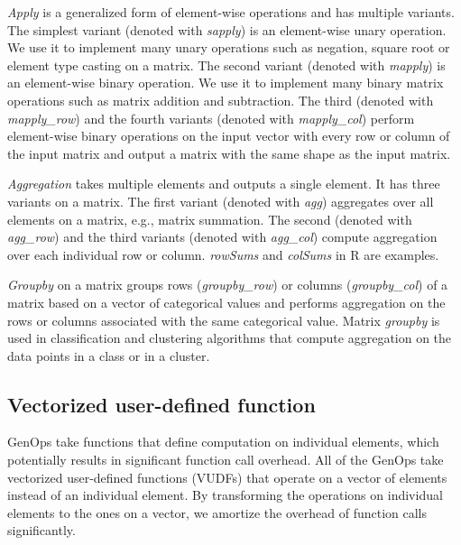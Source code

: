 \textit{Apply} is a generalized form of element-wise operations and has
multiple variants. The simplest variant (denoted with \textit{sapply}) is
an element-wise unary operation. We use it to implement many unary
operations such as negation, square root or element type casting
on a matrix. The second variant (denoted with \textit{mapply}) is an
element-wise binary operation. We use it to implement many binary
matrix operations such as matrix addition and subtraction. The third
(denoted with \textit{mapply\_row}) and the fourth variants (denoted with
\textit{mapply\_col}) perform element-wise
binary operations on the input vector with every row or column of the input
matrix and output a matrix with the same shape as the input matrix.

\textit{Aggregation} takes multiple elements and outputs a single element.
It has three variants on a matrix. The first variant (denoted with \textit{agg})
aggregates over all elements on a matrix, e.g., matrix summation. The second
(denoted with
\textit{agg\_row}) and the third variants (denoted with \textit{agg\_col})
compute aggregation over each individual row or column. \textit{rowSums}
and \textit{colSums} in R are examples.

\textit{Groupby} on a matrix groups rows (\textit{groupby\_row}) or columns
(\textit{groupby\_col}) of a matrix based on a vector of categorical values
and performs aggregation on the rows or
columns associated with the same categorical value. Matrix \textit{groupby}
is used in classification and clustering algorithms that compute
aggregation on the data points in a class or in a cluster.

\subsection{Vectorized user-defined function} \label{sec:vudf}
GenOps take functions that define computation on individual elements,
which potentially results in significant function call overhead. All of
the GenOps take vectorized user-defined functions (VUDFs) that operate on
a vector of elements instead of an individual element. By transforming
the operations on individual elements to the ones on a vector, we amortize
the overhead of function calls significantly.


